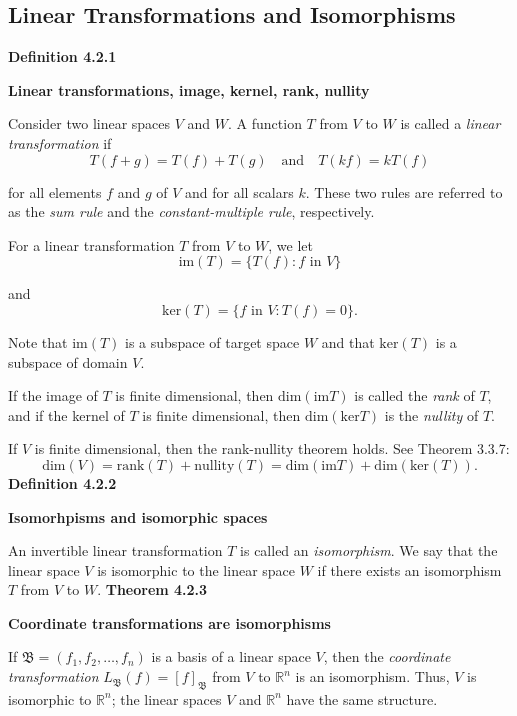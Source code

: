 \subsection{Linear Transformations and Isomorphisms}
\textbf{Definition 4.2.1}\\
\par\noindent\textbf{Linear transformations, image, kernel, rank, nullity}
\par\noindent Consider two linear spaces $V$ and $W$. A function $T$ from $V$ to $W$ is called a \textit{linear transformation} if
\[T(f+g)=T(f)+T(g)\quad{}\textrm{and}\quad{}T(kf)=kT(f)\]
\par\noindent for all elements $f$ and $g$ of $V$ and for all scalars $k$. These two rules are referred to as the \textit{sum rule} and the \textit{constant-multiple rule}, respectively.
\par\noindent For a linear transformation $T$ from $V$ to $W$, we let
\[\textrm{im}(T)=\{T(f):f\textrm{ in }V\}\]
\par\noindent and
\[\textrm{ker}(T)=\{f\textrm{ in }V:T(f)=0\}.\]
\par\noindent Note that $\textrm{im}(T)$ is a subspace of target space $W$ and that $\textrm{ker}(T)$ is a subspace of domain $V$.
\par\noindent If the image of $T$ is finite dimensional, then $\textrm{dim}(\textrm{im}T)$ is called the \textit{rank} of $T$, and if the kernel of $T$ is finite dimensional, then $\textrm{dim}(\textrm{ker}T)$ is the \textit{nullity} of $T$.
\par\noindent If $V$ is finite dimensional, then the rank-nullity theorem holds. See Theorem 3.3.7:
\[\textrm{dim}(V)=\textrm{rank}(T)+\textrm{nullity}(T)=\textrm{dim}(\textrm{im}T)+\textrm{dim}(\textrm{ker}(T)).\]
\textbf{Definition 4.2.2}\\
\par\noindent\textbf{Isomorhpisms and isomorphic spaces}
\par\noindent An invertible linear transformation $T$ is called an \textit{isomorphism}. We say that the linear space $V$ is isomorphic to the linear space $W$ if there exists an isomorphism $T$ from $V$ to $W$.
\textbf{Theorem 4.2.3}\\
\par\noindent\textbf{Coordinate transformations are isomorphisms}
\par\noindent If $\mathfrak{B}=(f_{1},f_{2},\ldots{},f_{n})$ is a basis of a linear space $V$, then the \textit{coordinate transformation} $L_{\mathfrak{B}}(f)=\left[f\right]_{\mathfrak{B}}$ from $V$ to $\mathbb{R}^{n}$ is an isomorphism. Thus, $V$ is isomorphic to $\mathbb{R}^{n}$; the linear spaces $V$ and $\mathbb{R}^{n}$ have the same structure.
